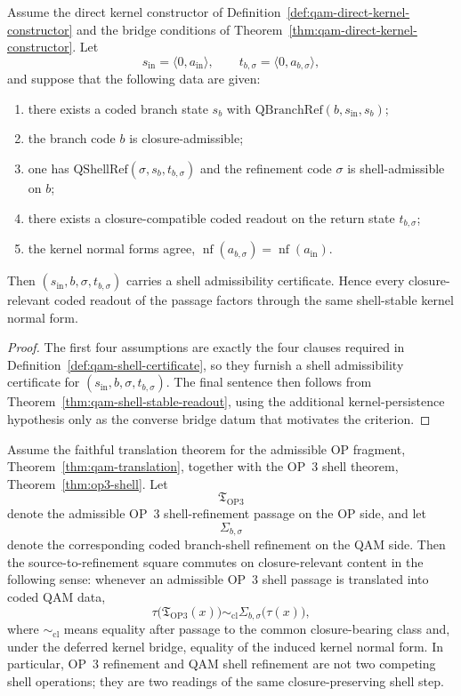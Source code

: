 \begin{proposition}\label{prop:qam-shell-converse-criterion}
Assume the direct kernel constructor of Definition~\ref{def:qam-direct-kernel-constructor} and the bridge conditions of Theorem~\ref{thm:qam-direct-kernel-constructor}. Let
\[
s_{\mathrm{in}}=\langle 0,a_{\mathrm{in}}\rangle,
\qquad
 t_{b,\sigma}=\langle 0,a_{b,\sigma}\rangle,
\]
and suppose that the following data are given:
\begin{enumerate}[leftmargin=2em]
  \item there exists a coded branch state $s_b$ with $\mathrm{QBranchRef}(b,s_{\mathrm{in}},s_b)$;
  \item the branch code $b$ is closure-admissible;
  \item one has $\mathrm{QShellRef}(\sigma,s_b,t_{b,\sigma})$ and the refinement code $\sigma$ is shell-admissible on $b$;
  \item there exists a closure-compatible coded readout on the return state $t_{b,\sigma}$;
  \item the kernel normal forms agree, $\operatorname{nf}(a_{b,\sigma})=\operatorname{nf}(a_{\mathrm{in}})$.
\end{enumerate}
Then $(s_{\mathrm{in}},b,\sigma,t_{b,\sigma})$ carries a shell admissibility certificate. Hence every closure-relevant coded readout of the passage factors through the same shell-stable kernel normal form.
\end{proposition}

\begin{proof}
The first four assumptions are exactly the four clauses required in Definition~\ref{def:qam-shell-certificate}, so they furnish a shell admissibility certificate for $(s_{\mathrm{in}},b,\sigma,t_{b,\sigma})$. The final sentence then follows from Theorem~\ref{thm:qam-shell-stable-readout}, using the additional kernel-persistence hypothesis only as the converse bridge datum that motivates the criterion.
\end{proof}

\begin{lemma}\label{lem:qam-op3-shell-commuting-square}
Assume the faithful translation theorem for the admissible OP fragment, Theorem~\ref{thm:qam-translation}, together with the OP~3 shell theorem, Theorem~\ref{thm:op3-shell}. Let
\[
\mathfrak T_{\mathrm{OP3}}
\]
denote the admissible OP~3 shell-refinement passage on the OP side, and let
\[
\Sigma_{b,\sigma}
\]
denote the corresponding coded branch-shell refinement on the QAM side. Then the source-to-refinement square commutes on closure-relevant content in the following sense: whenever an admissible OP~3 shell passage is translated into coded QAM data,
\[
\tau\bigl(\mathfrak T_{\mathrm{OP3}}(x)\bigr)
\sim_{\mathrm{cl}}
\Sigma_{b,\sigma}\bigl(\tau(x)\bigr),
\]
where $\sim_{\mathrm{cl}}$ means equality after passage to the common closure-bearing class and, under the deferred kernel bridge, equality of the induced kernel normal form. In particular, OP~3 refinement and QAM shell refinement are not two competing shell operations; they are two readings of the same closure-preserving shell step.
\end{lemma}

